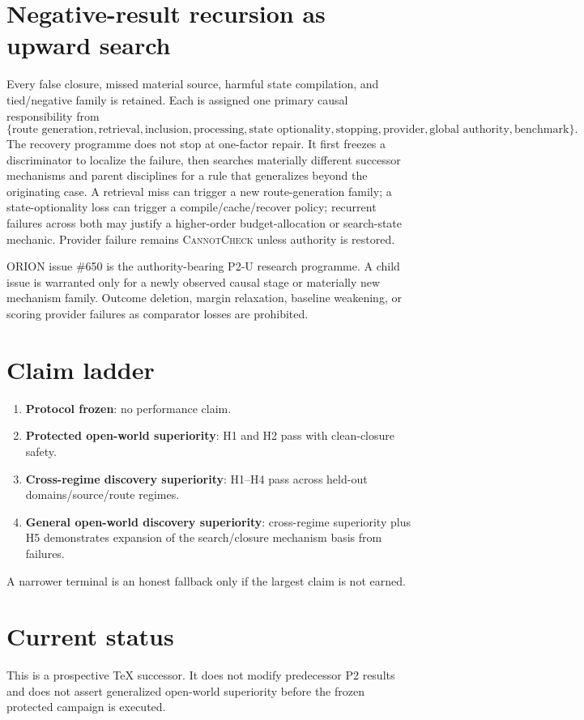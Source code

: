 \documentclass[11pt]{article}
\begin{document}
\section{Negative-result recursion as upward search}
Every false closure, missed material source, harmful state compilation, and tied/negative family is retained. Each is assigned one primary causal responsibility from
\[
\{\text{route generation},\text{retrieval},\text{inclusion},\text{processing},\text{state optionality},\text{stopping},\text{provider},\text{global authority},\text{benchmark}\}.
\]
The recovery programme does not stop at one-factor repair. It first freezes a discriminator to localize the failure, then searches materially different successor mechanisms and parent disciplines for a rule that generalizes beyond the originating case. A retrieval miss can trigger a new route-generation family; a state-optionality loss can trigger a compile/cache/recover policy; recurrent failures across both may justify a higher-order budget-allocation or search-state mechanic. Provider failure remains \textsc{CannotCheck} unless authority is restored.

ORION issue \#650 is the authority-bearing P2-U research programme. A child issue is warranted only for a newly observed causal stage or materially new mechanism family. Outcome deletion, margin relaxation, baseline weakening, or scoring provider failures as comparator losses are prohibited.

\section{Claim ladder}
\begin{enumerate}
    \item \textbf{Protocol frozen}: no performance claim.
    \item \textbf{Protected open-world superiority}: H1 and H2 pass with clean-closure safety.
    \item \textbf{Cross-regime discovery superiority}: H1--H4 pass across held-out domains/source/route regimes.
    \item \textbf{General open-world discovery superiority}: cross-regime superiority plus H5 demonstrates expansion of the search/closure mechanism basis from failures.
\end{enumerate}
A narrower terminal is an honest fallback only if the largest claim is not earned.

\section{Current status}
This is a prospective TeX successor. It does not modify predecessor P2 results and does not assert generalized open-world superiority before the frozen protected campaign is executed.
\end{document}
